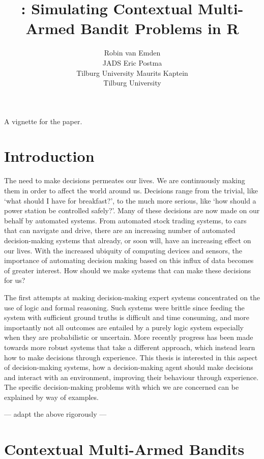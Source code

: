 \documentclass[nojss]{jss}\usepackage[]{graphicx}\usepackage[]{color}
\author{Robin van Emden\\JADS \And
  Eric Postma\\Tilburg University \And
  Maurits Kaptein\\Tilburg University}
\title{\pkg{contextual}: Simulating Contextual Multi-Armed Bandit Problems in R}
\begin{document}
A vignette for the \cite{contextual} paper.


\section{Introduction}

The need to make decisions permeates our lives. We are continuously making them in order to affect the world around us. Decisions range from the trivial, like ‘what should I have for breakfast?’, to the much more serious, like ‘how should a power station be controlled safely?’. Many of these decisions are now made on our behalf by automated systems. From automated stock trading systems, to cars that can navigate and drive, there are an increasing number of automated decision-making systems that already, or soon will, have an increasing effect on our lives. With the increased ubiquity of computing devices and sensors, the importance of automating decision making based on this influx of data becomes of greater interest. How should we make systems that can make these decisions for us?

The first attempts at making decision-making expert systems concentrated on the use of logic and formal reasoning. Such systems were brittle since feeding the system with sufficient ground truths is difficult and time consuming, and more importantly not all outcomes are entailed by a purely logic system especially when they are probabilistic or uncertain. More recently progress has been made towards more robust systems that take a different approach, which instead learn how to make decisions through experience. This thesis is interested in this aspect of decision-making systems, how a decision-making agent should make decisions and interact with an environment, improving their behaviour through experience. The specific decision-making problems with which we are concerned can be explained by way of examples.

--- adapt the above rigorously ---

\section{Contextual Multi-Armed Bandits}
\end{document}
